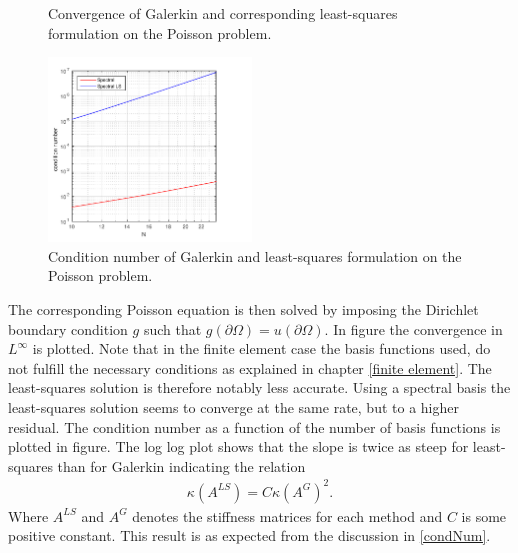 \begin{figure}[t]
\begin{subfigure}[b]{0.48\textwidth}
  \end{subfigure}
  \vspace{-0.1\baselineskip}
  \caption{Convergence of Galerkin and corresponding least-squares formulation on the Poisson problem.}
  \label{fig:ConvergencePoisson}
\end{figure}
%
\begin{figure}[b]
  \centering
	\includegraphics[width=0.48\textwidth]{Figures/condSpec-SpecLS.pdf}
  \caption{Condition number of Galerkin and least-squares formulation on the Poisson problem.}
  \label{fig:ConditionPoisson}
\end{figure}
%
The corresponding Poisson equation is then solved by imposing the Dirichlet boundary condition $g$ such that $g(\partial \Omega) = u(\partial \Omega)$.
In figure the convergence in $L^{\infty}$ is plotted. Note that in the finite element case the basis functions used, do not fulfill the necessary conditions as explained in chapter \ref{finite element}. The least-squares solution is therefore notably less accurate. Using a spectral basis the least-squares solution seems to converge at the same rate, but to a higher residual. The condition number as a function of the number of basis functions is plotted in figure. The log log plot shows that the slope is twice as steep for least-squares than for Galerkin indicating the relation 
%
\begin{align}
	\kappa(A^{LS})=C\kappa(A^{G})^{2}.
	\label{eq:condNumber}
\end{align}
%
Where $A^{LS}$ and $A^{G}$ denotes the stiffness matrices for each method and $C$ is some positive constant. 
 This result is as expected from the discussion in \ref{condNum}.   
%
